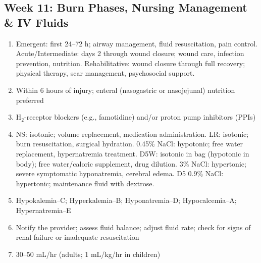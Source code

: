 \documentclass[11pt,letterpaper]{article}
\begin{document}
\begin{keybox}
\subsection*{Week 11: Burn Phases, Nursing Management \& IV Fluids}
\begin{enumerate}[leftmargin=1.5em,label=\textbf{\arabic*.},start=121]
  \item Emergent: first 24--72 h; airway management, fluid resuscitation, pain control.
        Acute/Intermediate: days 2 through wound closure; wound care, infection prevention, nutrition.
        Rehabilitative: wound closure through full recovery; physical therapy, scar management, psychosocial support.
  \item Within 6 hours of injury; enteral (nasogastric or nasojejunal) nutrition preferred
  \item H$_2$-receptor blockers (e.g., famotidine) and/or proton pump inhibitors (PPIs)
  \item NS: isotonic; volume replacement, medication administration.
        LR: isotonic; burn resuscitation, surgical hydration.
        0.45\% NaCl: hypotonic; free water replacement, hypernatremia treatment.
        D5W: isotonic in bag (hypotonic in body); free water/caloric supplement, drug dilution.
        3\% NaCl: hypertonic; severe symptomatic hyponatremia, cerebral edema.
        D5 0.9\% NaCl: hypertonic; maintenance fluid with dextrose.
  \item Hypokalemia--C; Hyperkalemia--B; Hyponatremia--D; Hypocalcemia--A; Hypernatremia--E
  \item Notify the provider; assess fluid balance; adjust fluid rate; check for signs of
        renal failure or inadequate resuscitation
  \item 30--50 mL/hr (adults; 1 mL/kg/hr in children)
\end{enumerate}

\hrulefill

\end{keybox}
\end{document}
